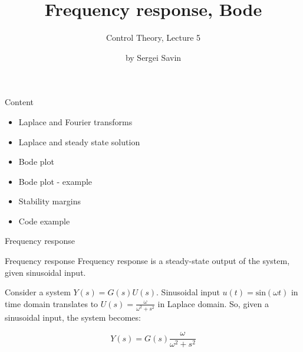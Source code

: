 \documentclass{beamer}
\title{Frequency response, Bode}
\subtitle{Control Theory, Lecture 5}
\author{by Sergei Savin}
\date{\mydate}
\begin{document}
\maketitle


\begin{frame}{Content}

\begin{itemize}
\item Laplace and Fourier transforms
\item Laplace and steady state solution
\item Bode plot
\item Bode plot - example
\item Stability margins
\item Code example
\end{itemize}

\end{frame}



\begin{frame}{Frequency response}
	\begin{flushleft}
		
		\begin{block}{Frequency response}
			Frequency response is a steady-state output of the system, given sinusoidal input.
		\end{block}
	
		\bigskip
	
		Consider a system $Y(s) = G(s)U(s)$. Sinusoidal input $u(t) = \text{sin}(\omega t)$ in time domain translates to $U(s) = \frac{\omega}{\omega^2 + s^2}$ in Laplace domain. So, given a sinusoidal input, the system becomes:
		
		\begin{equation}
			Y(s) = G(s)\frac{\omega}{\omega^2 + s^2}
		\end{equation}
		
	\end{flushleft}
\end{frame}
\end{document}

